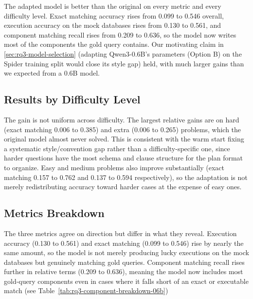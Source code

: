 The adapted model is better than the original on every metric and every difficulty level. Exact matching accuracy rises from 0.099 to 0.546 overall, execution accuracy on the mock databases rises from 0.130 to 0.561, and component matching recall rises from 0.209 to 0.636, so the model now writes most of the components the gold query contains. Our motivating claim in \ref{sec:rq3-model-selection} (adapting Qwen3-0.6B's parameters (Option B) on the Spider training split would close its style gap) held, with much larger gains than we expected from a 0.6B model.

\subsection{Results by Difficulty Level}
\label{sec:rq3-results-difficulty}

The gain is not uniform across difficulty. The largest relative gains are on hard (exact matching 0.006 to 0.385) and extra (0.006 to 0.265) problems, which the original model almost never solved. This is consistent with the warm start fixing a systematic style/convention gap rather than a difficulty-specific one, since harder questions have the most schema and clause structure for the plan format to organize. Easy and medium problems also improve substantially (exact matching 0.157 to 0.762 and 0.137 to 0.594 respectively), so the adaptation is not merely redistributing accuracy toward harder cases at the expense of easy ones.

\subsection{Metrics Breakdown}
\label{sec:rq3-metrics-breakdown}

The three metrics agree on direction but differ in what they reveal. Execution accuracy (0.130 to 0.561) and exact matching (0.099 to 0.546) rise by nearly the same amount, so the model is not merely producing lucky executions on the mock databases but genuinely matching gold queries. Component matching recall rises further in relative terms (0.209 to 0.636), meaning the model now includes most gold-query components even in cases where it falls short of an exact or executable match (see Table~\ref{tab:rq3-component-breakdown-06b})

